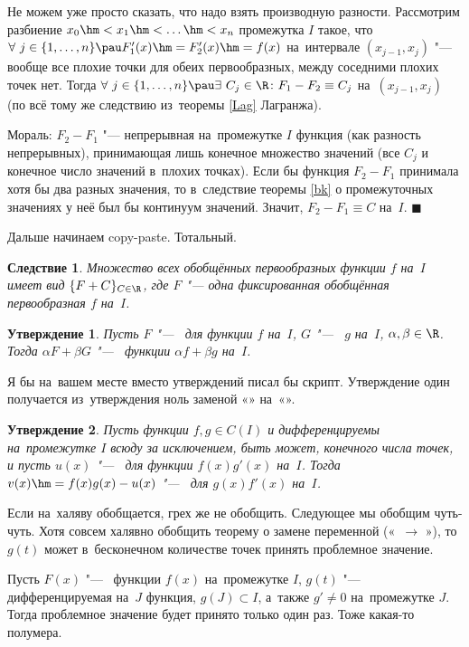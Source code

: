 \documentclass[a4paper,10pt,twoside]{article}
\newtheorem{Sl}{Следствие}[section]
\newtheorem{Ut}{Утверждение}[section]
\newenvironment{Proof}
       {\par\noindent{\textbf{Доказательство.}}}
       {\hfill$\scriptstyle\blacksquare$}
\begin{document}
\begin{Proof}
  Не можем уже просто сказать, что надо взять производную разности. Рассмотрим разбиение $x_0\hm<x_1\hm<\ldots\hm<x_n$ промежутка $I$ такое, что
  $\forall\  j\in\{1,\ldots,n\}\pau F_1'(x)\hm=F_2'(x)\hm=f(x)$ на~интервале $(x_{j-1},x_j)$ "--- вообще все плохие точки для обеих первообразных,
  между соседними плохих точек нет. Тогда $\forall\  j\in\{1,\ldots,n\}\pau \exists\  C_j\in\R\colon F_1-F_2\equiv C_j$ на~$(x_{j-1},x_j)$
  (по всё тому же следствию из~теоремы \ref{Lag} Лагранжа).

  Мораль: $F_2-F_1$ "--- непрерывная на~промежутке $I$ функция (как разность непрерывных), принимающая лишь конечное множество значений
  (все $C_j$  и конечное число значений в~плохих точках). Если бы функция $F_2-F_1$ принимала хотя бы два разных значения, то в~следствие теоремы \ref{bk} о
  промежуточных значениях у неё был бы континуум значений. Значит, $F_2-F_1\equiv C$ на~$I$.
\end{Proof}

Дальше начинаем copy-paste. Тотальный.

\begin{Sl}
  Множество всех обобщённых первообразных функции $f$ на~$I$ имеет вид $\{F+C\}_{C\in\R}$, где $F$ "--- одна фиксированная обобщённая первообразная $f$ на~$I$.
\end{Sl}

\begin{Ut}
  Пусть $F$ "--- \op\ для функции $f$ на~$I$, $G$ "--- \op\ $g$ на~$I$, $\alpha,\beta \in\R$.
  Тогда $\alpha F+\beta G$ "--- \op\ функции $\alpha f+ \beta g$ на~$I$.
\end{Ut}

Я бы на~вашем месте вместо утверждений писал бы скрипт. Утверждение один получается из~утверждения ноль заменой «\tp» на~«\op».

\begin{Ut}
  Пусть функции $f,g\in C(I)$ и дифференцируемы на~промежутке $I$ всюду за исключением, быть может, конечного числа точек, и пусть $u(x)$ "--- \op\ для
  функции $f(x)g'(x)$ на~$I$.
  Тогда $v(x)\hm=f(x)g(x)-u(x)$ "--- \op\ для $g(x)f'(x)$ на~$I$.
\end{Ut}

Если на~халяву обобщается, грех же не обобщить. Следующее мы обобщим чуть-чуть. Хотя совсем халявно обобщить теорему о замене переменной («\tp\
$\longrightarrow$ \op»), то $g(t)$ может в~бесконечном количестве точек принять проблемное значение.

Пусть $F(x)$ "--- \op\ функции $f(x)$ на~промежутке $I$, $g(t)$ "--- дифференцируемая на~$J$ функция, $g(J)\subset I$, а~также $g'\neq 0$ на~промежутке $J$.
Тогда проблемное значение будет принято только один раз. Тоже какая-то полумера.
\end{document}
